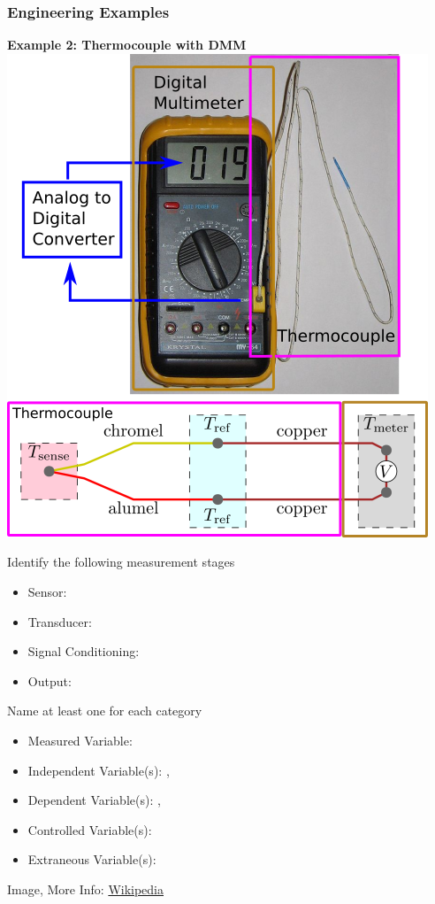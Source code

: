 \documentclass[fleqn]{beamer} %
\newcommand{\sectiontitleV}{Engineering Examples}
\begin{document}
	\begin{frame}[label=sectionV]
		\frametitle{\sectiontitleV}
			\tiny
		
	        \begin{multicols}{2}
		
		    \textbf{Example 2: Thermocouple with DMM} \vspc
		    \includegraphics[scale=0.4]{thermocouple_atd.png} \vspc

		    Identify the following measurement stages 
		    \begin{itemize}
		    	\item Sensor: \hspcu
		    	\item Transducer: \hspcu
		    	\item Signal Conditioning: \hspcu
		    	\item Output: \hspcu
		    \end{itemize}


		    Name at least one for each category 
	
			\begin{itemize}
				\item Measured Variable: \hspcu \vspc 
				\item Independent Variable(s): \hspcu, \hspcu \vspc
				\item Dependent Variable(s): \hspcu, \hspcu \vspc 
				\item Controlled Variable(s): \hspcu \vspc 
				\item Extraneous Variable(s):\hspcu \vspc
			\end{itemize}
			
			\end{multicols}	

			{\tiny Image, More Info: \href{https://en.wikipedia.org/wiki/Thermocouple}{Wikipedia} }\hspace{40mm} 

	\end{frame}
\end{document}
